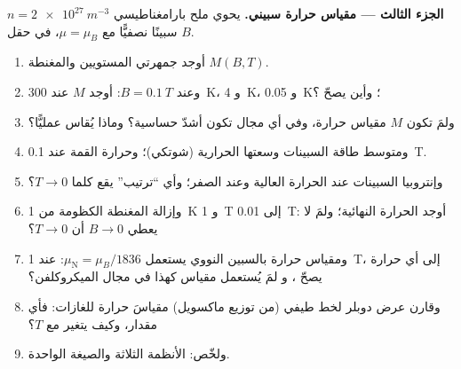 \begin{problem}
\textbf{الجزء الثالث --- مقياس حرارة سبيني.}
يحوي ملح بارامغناطيسي $n = \qty{2e27}{m^{-3}}$ سبينًا نصفيًّا مع $\mu
= \mu_B$، في حقل $B$.
\begin{enumerate}[resume]
  \item أوجد جمهرتي المستويين والمغنطة
        $M(B,T)$.
  \item وعند $B = \qty{0.1}{T}$: أوجد $M$ عند \qty{300}{K}، و \qty{4}{K}، و \qty{0.05}{K}؛
        وأين يصحّ ؟
  \item ولمَ تكون $M$ مقياس حرارة، وفي أي مجال تكون أشدّ
        حساسية؟ وماذا يُقاس عمليًّا؟
  \item ومتوسط طاقة السبينات وسعتها الحرارية (شوتكي)؛
        وحرارة القمة عند \qty{0.1}{T}.
  \item وإنتروبيا السبينات عند الحرارة العالية وعند الصفر؛ وأي
        ``ترتيب'' يقع كلما $T \to 0$؟
  \item وإزالة المغنطة الكظومة من \qty{1}{K} و \qty{1}{T} إلى \qty{0.01}{T}:
        أوجد الحرارة النهائية؛ ولمَ لا يعطي $B \to 0$ أن $T \to 0$؟
  \item ومقياس حرارة بالسبين النووي يستعمل $\mu_{\text{N}} = \mu_B/1836$: عند
        \qty{1}{T}، إلى أي حرارة يصحّ ، و
        لمَ يُستعمل مقياس كهذا في مجال الميكروكلفن؟
  \item وقارن عرض دوبلر لخط طيفي (من توزيع ماكسويل)
        مقياسَ حرارة للغازات: فأي مقدار، وكيف
        يتغير مع $T$؟
  \item ولخّص: الأنظمة الثلاثة والصيغة الواحدة.
\end{enumerate}
\end{problem}
